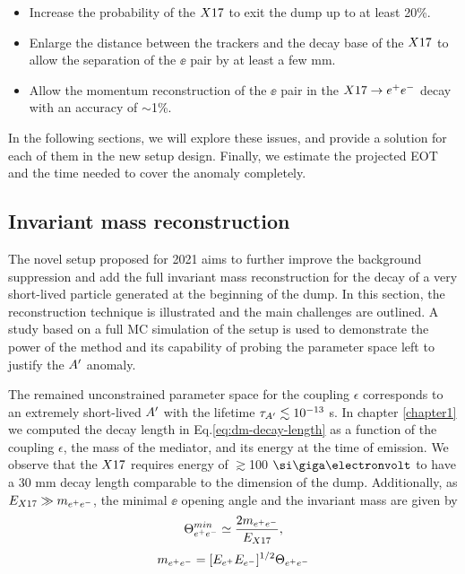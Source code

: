 \begin{itemize}
\item Increase the probability of the $X17$ to exit the dump up to at least 20\%.
\item Enlarge the distance between the trackers and the decay base of the $X17$ to allow the separation of the $\ee$ pair by at least a few mm.
\item Allow the momentum reconstruction of the $\ee$ pair in the $X17 \rightarrow e^+ e^-$ decay with an accuracy of $\sim$1\%.
\end{itemize}

In the following sections, we will explore these issues, and provide a solution for each of them in the new setup design. Finally, we estimate the projected  EOT and the time needed to cover the anomaly completely.

\subsection{Invariant mass reconstruction}
\label{ch5:sec:new-vismode-setup-invmass}

The novel setup proposed for 2021 aims to further improve the background suppression and add the full invariant mass reconstruction for the decay of a very short-lived particle generated at the beginning of the dump. In this section, the reconstruction technique is illustrated and the main challenges are outlined. A study based on a full MC simulation of the setup is used to demonstrate the power of the method and its capability of probing the parameter space left to justify the $A'$ anomaly.

The remained unconstrained parameter space for the coupling $\epsilon$ corresponds to an extremely short-lived $A'$ with the lifetime $\tau_{A'} \lesssim 10^{-13}$ s. In chapter \ref{chapter1} we computed the decay length in Eq.\ref{eq:dm-decay-length} as a function of the coupling $\epsilon$, the mass of the mediator, and its energy at the time of emission.
We observe that the $X17$ requires energy of $\gtrsim$100 $\gev$ to have a 30 mm decay length comparable to the dimension of the dump.
Additionally, as $E_{X17} \gg m_{e^+e^-}$, the minimal $\ee$ opening angle and the invariant mass are given by
\begin{equation} 
\Theta_{ e^+e^-}^{min} \simeq  \frac{2m_{e^+e^-}}{E_{X17}},
\label{eqn:angle}
\end{equation}
\begin{equation}
m_{e^+e^-} = [E_{e^+} E_{e^-}]^{1/2} \Theta_{ e^+e^-}
\label{eqn:imass}
\end{equation}

